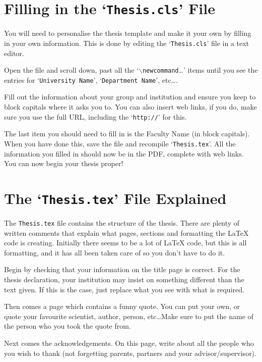 \section{Filling in the `\texttt{Thesis.cls}' File}\label{FillingFile}

You will need to personalise the thesis template and make it your own by filling in your own information. This is done by editing the `\texttt{Thesis.cls}' file in a text editor.

Open the file and scroll down, past all the `$\backslash$\texttt{newcommand}\ldots' items until you see the entries for `\texttt{University Name}', `\texttt{Department Name}', etc\ldots.

Fill out the information about your group and institution and ensure you keep to block capitals where it asks you to. You can also insert web links, if you do, make sure you use the full URL, including the `\texttt{http://}' for this.

The last item you should need to fill in is the Faculty Name (in block capitals). When you have done this, save the file and recompile `\texttt{Thesis.tex}'. All the information you filled in should now be in the PDF, complete with web links. You can now begin your thesis proper!


\section{The `\texttt{Thesis.tex}' File Explained}

The \texttt{Thesis.tex} file contains the structure of the thesis. There are plenty of written comments that explain what pages, sections and formatting the \LaTeX{} code is creating. Initially there seems to be a lot of \LaTeX{} code, but this is all formatting, and it has all been taken care of so you don't have to do it.

Begin by checking that your information on the title page is correct. For the thesis declaration, your institution may insist on something different than the text given. If this is the case, just replace what you see with what is required.

Then comes a page which contains a funny quote. You can put your own, or quote your favourite scientist, author, person, etc\ldots Make sure to put the name of the person who you took the quote from.

Next comes the acknowledgements. On this page, write about all the people who you wish to thank (not forgetting parents, partners and your advisor/supervisor).

